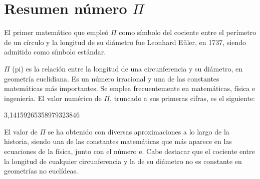 \section{Resumen número $\Pi$}
\label{1:sec:1}

El primer matemático que empleó $\Pi$ como símbolo del cociente entre el perímetro de un círculo y la longitud de su diámetro fue Leonhard Eüler, en 1737, siendo admitido como símbolo estándar.

$\Pi$ (pi) es la relación entre la longitud de una circunferencia y su diámetro, en geometría euclidiana. Es un número irracional y una de las constantes matemáticas más importantes. Se emplea frecuentemente en matemáticas, física e ingeniería. El valor numérico de $\Pi$, truncado a sus primeras cifras, es el siguiente:

   3,14159265358979323846

El valor de $\Pi$ se ha obtenido con diversas aproximaciones a lo largo de la historia, siendo una de las constantes matemáticas que más aparece en las ecuaciones de la física, junto con el número e. Cabe destacar que el cociente entre la longitud de cualquier circunferencia y la de su diámetro no es constante en geometrías no euclídeas.